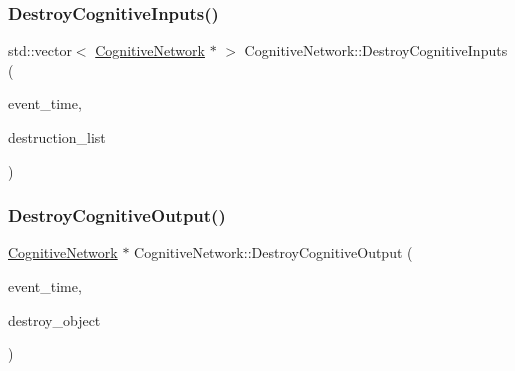 \subsubsection{\texorpdfstring{Destroy\+Cognitive\+Inputs()}{DestroyCognitiveInputs()}}
{\footnotesize\ttfamily std\+::vector$<$ \mbox{\hyperlink{classCognitiveNetwork}{Cognitive\+Network}} $\ast$ $>$ Cognitive\+Network\+::\+Destroy\+Cognitive\+Inputs (\begin{DoxyParamCaption}\item[{std\+::chrono\+::time\+\_\+point$<$ \mbox{\hyperlink{universe_8h_a0ef8d951d1ca5ab3cfaf7ab4c7a6fd80}{Clock}} $>$}]{event\+\_\+time,  }\item[{std\+::vector$<$ \mbox{\hyperlink{classCognitiveNetwork}{Cognitive\+Network}} $\ast$$>$}]{destruction\+\_\+list }\end{DoxyParamCaption})}

\mbox{\label{classCognitiveNetwork_a8475cf7277d25532bb31926e768600e8}} 
\subsubsection{\texorpdfstring{Destroy\+Cognitive\+Output()}{DestroyCognitiveOutput()}}
{\footnotesize\ttfamily \mbox{\hyperlink{classCognitiveNetwork}{Cognitive\+Network}} $\ast$ Cognitive\+Network\+::\+Destroy\+Cognitive\+Output (\begin{DoxyParamCaption}\item[{std\+::chrono\+::time\+\_\+point$<$ \mbox{\hyperlink{universe_8h_a0ef8d951d1ca5ab3cfaf7ab4c7a6fd80}{Clock}} $>$}]{event\+\_\+time,  }\item[{\mbox{\hyperlink{classCognitiveNetwork}{Cognitive\+Network}} $\ast$}]{destroy\+\_\+object }\end{DoxyParamCaption})}

\mbox{\label{classCognitiveNetwork_ad08191cbab02f26f69d25bc7e6b5c1ee}} 
